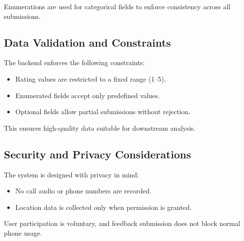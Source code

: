 \documentclass{article}
\begin{document}
Enumerations are used for categorical fields to enforce consistency across all submissions.

\subsection{Data Validation and Constraints}

The backend enforces the following constraints:
\begin{itemize}
    \item Rating values are restricted to a fixed range (1--5).
    \item Enumerated fields accept only predefined values.
    \item Optional fields allow partial submissions without rejection.
\end{itemize}

This ensures high-quality data suitable for downstream analysis.

\subsection{Security and Privacy Considerations}

The system is designed with privacy in mind:
\begin{itemize}
    \item No call audio or phone numbers are recorded.
    \item Location data is collected only when permission is granted.

\end{itemize}

User participation is voluntary, and feedback submission does not block normal phone usage.
\end{document}
